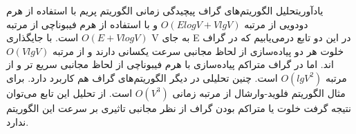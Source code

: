 \begin{itemframe-s}{یادآوری}{تحلیل الگوریتم‌های گراف}
\itm
پیچیدگی زمانی الگوریتم پریم با استفاده از هرم دودویی از مرتبه
$O(E logV+V lgV)$
و با استفاده از هرم فیبوناچی از مرتبه
$O(E+V logV)$
است. با جایگذاری V به جای E در این دو تابع درمی‌یابیم که در گراف خلوت هر دو پیاده‌سازی‌ از لحاظ مجانبی سرعت یکسانی دارند و از مرتبه
$O(Vlg V)$
اند. اما در گراف متراکم پیاده‌سازی با هرم فیبوناچی از لحاظ مجانبی سریع تر و از مرتبه
$O(lgV^2)$
 است.
\itm
چنین تحلیلی در دیگر الگوریتم‌‌های گراف هم کاربرد دارد. برای مثال الگوریتم فلوید-وارشال از مرتبه زمانی
$O(V^3)$
 است. از تحلیل این تابع می‌توان نتیجه گرفت خلوت یا متراکم بودن گراف از نظر مجانبی تاثیری بر سرعت این الگوریتم ندارد.
\end{itemframe-s}



